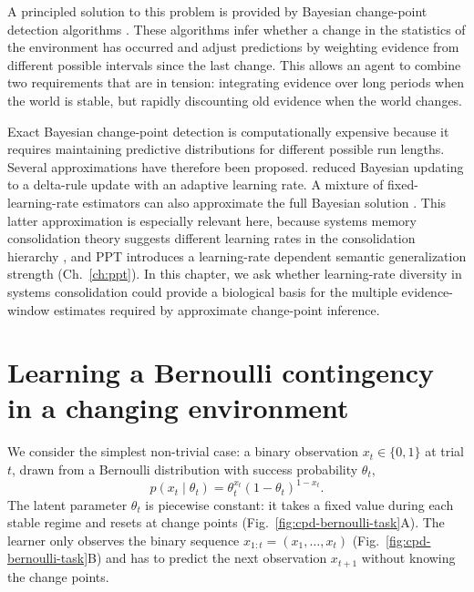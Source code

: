 A principled solution to this problem is provided by Bayesian change-point detection algorithms \citep{Adams2007}. These algorithms infer whether a change in the statistics of the environment has occurred and adjust predictions by weighting evidence from different possible intervals since the last change. This allows an agent to combine two requirements that are in tension: integrating evidence over long periods when the world is stable, but rapidly discounting old evidence when the world changes.

Exact Bayesian change-point detection is computationally expensive because it requires maintaining predictive distributions for different possible run lengths. Several approximations have therefore been proposed. \citet{Nassar2010} reduced Bayesian updating to a delta-rule update with an adaptive learning rate. A mixture of fixed-learning-rate estimators can also approximate the full Bayesian solution \citep{Wilson2013}. This latter approximation is especially relevant here, because systems memory consolidation theory suggests different learning rates in the consolidation hierarchy \citep{McClelland1995,Roxin2013}, and PPT introduces a learning-rate dependent semantic generalization strength (Ch.~\ref{ch:ppt}). In this chapter, we ask whether learning-rate diversity in systems consolidation could provide a biological basis for the multiple evidence-window estimates required by approximate change-point inference.

\section{Learning a Bernoulli contingency in a changing environment}


We consider the simplest non-trivial case: a binary observation $x_t \in \{0,1\}$ at trial $t$, drawn from a Bernoulli distribution with success probability $\theta_t$,
\begin{equation}
    p(x_t \mid \theta_t) = \theta_t^{x_t}(1-\theta_t)^{1-x_t}.
\end{equation}
The latent parameter $\theta_t$ is piecewise constant: it takes a fixed value during each stable regime and resets at change points (Fig.~\ref{fig:cpd-bernoulli-task}A). The learner only observes the binary sequence $x_{1:t} = (x_1, \dots, x_t)$ (Fig.~\ref{fig:cpd-bernoulli-task}B) and has to predict the next observation $x_{t+1}$ without knowing the change points.

